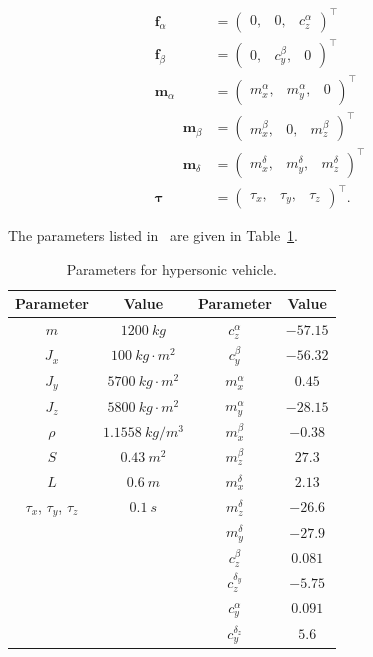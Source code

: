 \documentclass{article}
\newcommand{\fbf}{\mathbf{f}}
\newcommand{\mbf}{\mathbf{m}}
\newcommand{\taubf}{\boldsymbol{\tau}}
\begin{document}
\begin{align*}
	\fbf_\alpha &= \begin{pmatrix} 0, & 0, & c_z^\alpha \end{pmatrix}^\top\\ 
	\fbf_\beta &= \begin{pmatrix} 0, & c_y^\beta, & 0\end{pmatrix}^\top \\
	\mbf_\alpha &= \begin{pmatrix} m_x^\alpha, & m_y^\alpha, & 0 \end{pmatrix}^\top \\
	\qquad
	\mbf_\beta &= \begin{pmatrix} m_x^\beta, & 0, & m_z^\beta \end{pmatrix}^\top \\
	\qquad
	\mbf_\delta &= \begin{pmatrix} m_x^\delta, & m_y^\delta, & m_z^\delta \end{pmatrix}^\top \\
	\taubf &= \begin{pmatrix}\tau_x, & \tau_y, & \tau_z \end{pmatrix}^\top.
\end{align*}

The parameters listed in~\cite{LiZhangZhang23} are given in Table~\ref{tab:parameters}. 
\begin{table}[h!]
\caption{Parameters for hypersonic vehicle.}
\centering
 \begin{tabular}{||c c || c c||} 
 \hline
 Parameter & Value & Parameter & Value \\ [0.5ex] 
 \hline\hline
 $m$ & $1200~kg$ & $c_z^\alpha$ & $-57.15$ \\ 
 $J_x$ & $100~kg\cdot m^2$ & $c_y^\beta$ & $-56.32$ \\
 $J_y$ & $5700~kg\cdot m^2$ & $m_x^\alpha$ & $0.45$ \\
 $J_z$ & $5800~kg\cdot m^2$ & $m_y^\alpha$ & $-28.15$ \\
 $\rho$ & $1.1558~kg/m^3$ & $m_x^\beta$ & $-0.38$ \\
 $S$ & $0.43~m^2$ & $m_z^\beta$ & $27.3$ \\
 $L$ & $0.6~m$ & $m_x^\delta$ & $2.13$ \\
 $\tau_x$, $\tau_y$, $\tau_z$ & $0.1~s$ & $m_z^\delta$ & $-26.6$ \\
  &  & $m_y^\delta$ & $-27.9$ \\ 
  &  & $c_z^\beta$ & $0.081$\\
  &  & $c_z^{\delta_y}$ & $-5.75$\\
  &  & $c_y^\alpha$ & $0.091$\\
  &  & $c_y^{\delta_z}$ & $5.6$\\[1ex] 
 \hline
 \end{tabular}
 \label{tab:parameters}
\end{table}
\end{document}
